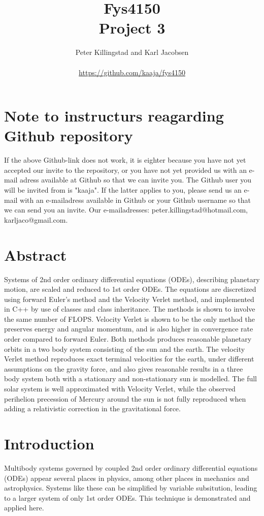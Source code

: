 \documentclass{article}
\title{Fys4150\\Project 3\\ }
\author{Peter Killingstad and Karl Jacobsen\\
\\
\url{https://github.com/kaaja/fys4150}}
\begin{document}
	
\maketitle



\section*{Note to instructurs reagarding Github repository}
If the above Github-link does not work, it is eighter because you have not yet accepted our invite to the repository, or you have not yet provided us with an e-mail adress available at Github so that we can invite you. The Github user you will be invited from is "kaaja". If the latter applies to you, please send us an e-mail with an e-mailadress available in Github or your Github username so that we can send you an invite. Our e-mailadresses: peter.killingstad@hotmail.com, karljaco@gmail.com.



\section*{Abstract}
Systems of 2nd order ordinary differential equations (ODEs), describing planetary motion, are scaled and reduced to 1st order ODEs. The equations are discretized using forward Euler's method and the Velocity Verlet method, and implemented in C++ by use of classes and class inheritance. The methods is shown to involve the same number of FLOPS. Velocity Verlet is shown to be the only method the preserves energy and angular momentum, and is also higher in convergence rate order compared to forward Euler. Both methods produces reasonable planetary orbits in a two body system consisting of the sun and the earth. The velocity Verlet method reproduces exact terminal velocities for the earth, under different assumptions on the gravity force, and also gives reasonable results in a three body system both with a stationary and non-stationary sun is modelled. The full solar system is well approximated with Velocity Verlet, while the observed perihelion precession of Mercury around the sun is not fully reproduced when adding a relativistic correction in the gravitational force.


\section{Introduction}
Multibody systems governed by coupled 2nd order ordinary differential equations (ODEs) appear several places in physics, among other places in mechanics and astrophysics. Systems like these can be simplified by variable subsitution, leading to a larger system of only 1st order ODEs. This technique is demonstrated and applied here.\\
\end{document}

